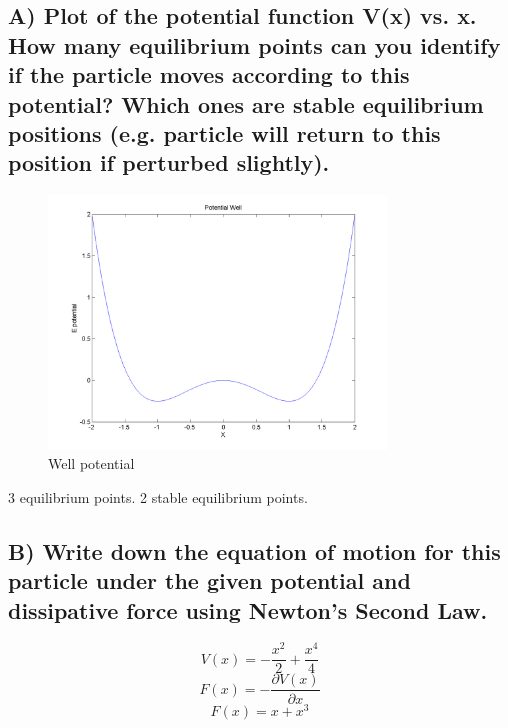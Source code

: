 \documentclass[paper=a4, fontsize=12pt]{scrartcl} %
\numberwithin{equation}{section} %
\numberwithin{figure}{section} %
\numberwithin{table}{section} %
\begin{document}
\subsection*{\small{A) Plot of the potential function V(x) vs. x. How many equilibrium points can you identify if the particle moves according to this potential? Which ones are stable
equilibrium positions (e.g. particle will return to this position if perturbed
slightly).}}
\begin{figure}[H]
  \centering
      \includegraphics[width=0.8\textwidth]{Well.png}
  \caption{Well potential}
\end{figure}
3 equilibrium points. 2 stable equilibrium points.
\subsection*{\small{B) Write down the equation of motion for this particle under the given potential and dissipative force using Newton’s Second Law.}}
\[ V(x) = - \frac{x^2}{2} + \frac{x^4}{4}\] 
\[F(x) = -\frac{\partial V(x)}{\partial x}\]
\[F(x) = x + x^3\]
\begin{center}
\end{center} 
\end{document}
